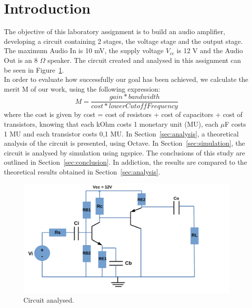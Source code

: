 \newpage
\section{Introduction}
\label{sec:introduction}

The objective of this laboratory assignment is to build an audio amplifier, developing a circuit containing 2 stages, the voltage stage and the output stage.
The maximum Audio In is 10 mV, the supply voltage $V_{cc}$ is 12 V and the Audio Out is an 8 $\Omega$ speaker.
The circuit created and analysed in this assignment can be seen in Figure~\ref{fig:Circuit}.\\
In order to evaluate how successfully our goal has been achieved, we calculate the merit M of our work, using the following expression:
\begin{equation}
M = \frac{gain*bandwidth}{cost*lowerCutoffFrequency}
  \label{eq:merit}
\end{equation}
where the cost is given by cost = cost of resistors + cost of capacitors + cost of transistors, knowing that each kOhm costs 1 monetary unit (MU), 
each $\mu$F costs 1 MU and each transistor costs 0,1 MU.
\noindent In Section~\ref{sec:analysis}, a theoretical analysis of the circuit is
presented, using Octave. In Section~\ref{sec:simulation}, the circuit is analysed by
simulation using ngspice. The conclusions of this study are outlined in
Section~\ref{sec:conclusion}. In addiction, the results are compared to the theoretical results obtained in Section~\ref{sec:analysis}.

\begin{figure}[h!] \centering
\includegraphics[width=1\linewidth]{Circuit.pdf}
\caption{Circuit analysed.}
\label{fig:Circuit}
\end{figure}

